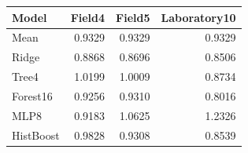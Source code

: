 \begin{tabular}{lrrr}
\toprule
Model & Field4 & Field5 & Laboratory10 \\
\midrule
Mean & 0.9329 & 0.9329 & 0.9329 \\
Ridge & 0.8868 & 0.8696 & 0.8506 \\
Tree4 & 1.0199 & 1.0009 & 0.8734 \\
Forest16 & 0.9256 & 0.9310 & 0.8016 \\
MLP8 & 0.9183 & 1.0625 & 1.2326 \\
HistBoost & 0.9828 & 0.9308 & 0.8539 \\
\bottomrule
\end{tabular}